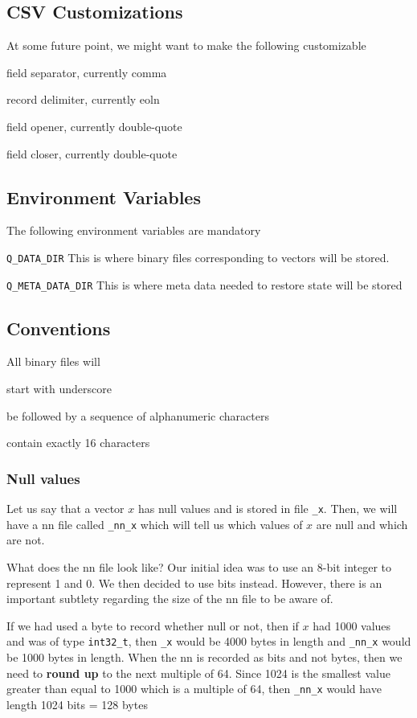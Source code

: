 \documentclass[letterpaper]{article}
\begin{document}
\ee
\subsection{CSV Customizations}
\label{csv_custom}
At some future point, we might want to make the following customizable
\be
\item field separator, currently comma
\item record delimiter, currently eoln
\item field opener, currently double-quote
\item field closer, currently double-quote
\ee

\subsection{Environment Variables}
The following environment variables are mandatory
\be
\item \verb+Q_DATA_DIR+ This is where binary files corresponding to vectors will
  be stored. 
\item \verb+Q_META_DATA_DIR+ This is where meta data needed to restore state
  will be stored
\ee

\subsection{Conventions}
\label{conventions}

All binary files will 
\be
\item start with underscore 
\item be followed by a sequence of alphanumeric characters 
\item contain exactly 16 characters
\ee

\subsubsection{Null values}
\label{null_values}
Let us say that a vector \(x\) has null values and is stored in file
\verb+_x+.  Then, we will have a nn file called \verb+_nn_x+ which
will tell us which values of \(x\) are null and which are not.

What does the nn file look like? Our initial idea was to use an 8-bit
integer to represent 1 and 0. We then decided to use bits
instead. However, there is an important subtlety regarding the size of
the nn file to be aware of.

If we had used a byte to record whether null or not, then if \(x\) had
1000 values and was of type \verb+int32_t+, then \verb+_x+ would be
4000 bytes in length and \verb+_nn_x+ would be 1000 bytes in
length. When the nn is recorded as bits and not bytes, then we need to
{\bf round up} to the next multiple of 64. Since 1024 is the smallest
value greater than equal to 1000 which is a multiple of 64, then
\verb+_nn_x+ would have length 1024 bits = 128 bytes
\end{document}
